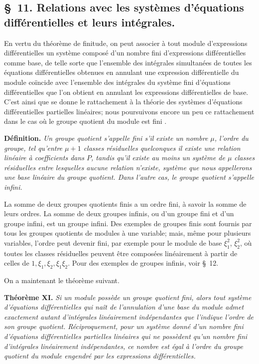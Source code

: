 
\subsection*{\S~11. Relations avec les systèmes d'équations différentielles et leurs intégrales.}

En vertu du théorème de finitude, on peut associer à tout module d'expressions différentielles un système composé d'un nombre fini d'expressions différentielles comme base, de telle sorte que l'ensemble des intégrales simultanées de toutes les équations différentielles obtenues en annulant une expression différentielle du module coïncide avec l'ensemble des intégrales du système fini d'équations différentielles que l'on obtient en annulant les expressions différentielles de base. C'est ainsi que se donne le rattachement à la théorie des systèmes d'équations différentielles partielles linéaires; nous poursuivons encore un peu ce rattachement dans le cas où le groupe quotient du module est \og{} fini \fg{}.

\textbf{Définition.} \emph{Un groupe quotient s'appelle fini s'il existe un nombre $\mu$, l'ordre du groupe, tel qu'entre $\mu+1$ classes résiduelles quelconques il existe une relation linéaire à coefficients dans $P$, tandis qu'il existe au moins un système de $\mu$ classes résiduelles entre lesquelles aucune relation n'existe, système que nous appellerons une base linéaire du groupe quotient. Dans l'autre cas, le groupe quotient s'appelle infini.}

La somme de deux groupes quotients finis a un ordre fini, à savoir la somme de leurs ordres. La somme de deux groupes infinis, ou d'un groupe fini et d'un groupe infini, est un groupe infini. Des exemples de groupes finis sont fournis par tous les groupes quotients de modules à une variable; mais, même pour plusieurs variables, l'ordre peut devenir fini, par exemple pour le module de base $\xi_1^2$, $\xi_2^2$, où toutes les classes résiduelles peuvent être composées linéairement à partir de celles de $1,\xi_1,\xi_2,\xi_1\xi_2$. Pour des exemples de groupes infinis, voir \S~12.

On a maintenant le théorème suivant.

\textbf{Théorème XI.} \emph{Si un module possède un groupe quotient fini, alors tout système d'équations différentielles qui naît de l'annulation d'une base du module admet exactement autant d'intégrales linéairement indépendantes que l'indique l'ordre de son groupe quotient. Réciproquement, pour un système donné d'un nombre fini d'équations différentielles partielles linéaires qui ne possèdent qu'un nombre fini d'intégrales linéairement indépendantes, ce nombre est égal à l'ordre du groupe quotient du module engendré par les expressions différentielles.}

